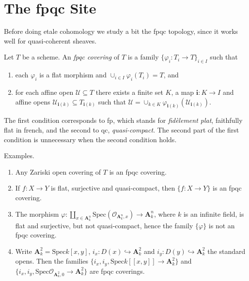 \section{The fpqc Site}
\label{section-fpqc}

\noindent
Before doing etale cohomology we study a bit the fpqc topology, since
it works well for quasi-coherent sheaves.

\begin{definition}
\label{definition-fpqc-covering}
Let $T$ be a scheme. An {\it fpqc covering} of $T$ is a family
$\{ \varphi_i : T_i \to T\}_{i \in I}$ such that
\begin{enumerate}
\item each $\varphi_i$ is a flat morphism and
$\cup_{i\in I} \varphi_i (T_i) = T$, and
\item for each affine open $\mathcal{U} \subseteq T$ there exists a finite
set $K$, a map $\mathbf{i} : K \to I$ and affine opens
$\mathcal{U}_{\mathbf{i}(k)} \subseteq T_{\mathbf{i}(k)}$ such that
$\mathcal{U} =
\cup_{k \in K} \varphi_{\mathbf{i}(k)}(\mathcal{U}_{\mathbf{i}(k)})$.
\end{enumerate}
\end{definition}

\begin{remark}
\label{remark-fpqc}
The first condition corresponds to fp, which stands for {\it fid\`element
plat}, faithfully flat in french, and the second to qc, {\it quasi-compact}.
The second part of the first condition is unnecessary when the second condition
holds.
\end{remark}

\begin{example}
\label{example-fpqc-coverings}
Examples.
\begin{enumerate}
\item Any Zariski open covering of $T$ is an fpqc covering.
\item If $f: X \to Y$ is flat, surjective and quasi-compact, then $\{ f: X\to
Y\}$ is an fpqc covering.
\item The morphism $\varphi: \coprod_{x \in \mathbf{A}^n_k} \text{Spec}
(\mathcal{O}_{\mathbf{A}^n_k,x}) \to \mathbf{A}^n_k $, where $k$ is an infinite
field, is flat and surjective, but not quasi-compact, hence the family $\{
\varphi \}$ is not an fpqc covering.
\item Write $\mathbf{A}^2_k = \text{Spec} k[x,y]$, $i_x : D(x) \hookrightarrow
\mathbf{A}^2_k$ and $i_y : D(y) \hookrightarrow \mathbf{A}^2_k$ the standard
opens. Then the families $\{i_x, i_y, \text{Spec} k[[ x,y ]] \to \mathbf{A}^2_k
\}$ and $\{i_x, i_y, \text{Spec} \mathcal{O}_{\mathbf{A}^2_k,0} \to
\mathbf{A}^2_k \}$ are fpqc coverings.
\end{enumerate}
\end{example}


